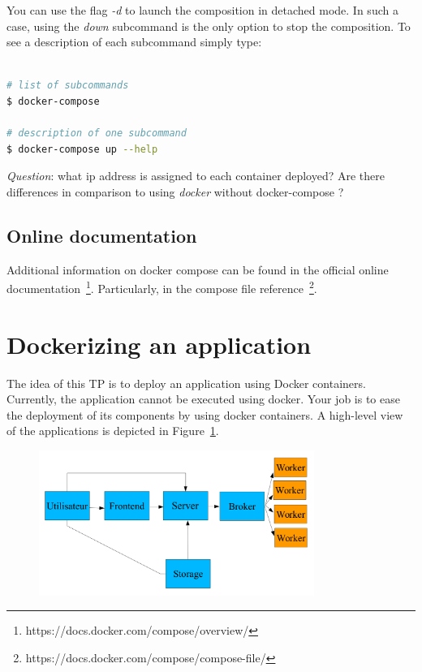\documentclass[a4paper,11pt]{exam}
\begin{document}
You can use the flag \textit{-d} to launch the composition in detached mode. In such a case, using the \textit{down} subcommand is the only option to stop the composition. 
To see a description of each subcommand simply type:
\begin{lstlisting}[frame=single,language={sh}] % Start your code-block

# list of subcommands
$ docker-compose

# description of one subcommand
$ docker-compose up --help
\end{lstlisting}

\textit{Question}: what ip address is assigned to each container deployed? Are there differences in comparison to using \textit{docker} without docker-compose ?

\subsection{Online documentation}
Additional information on docker compose can be found in the official online documentation~\footnote{https://docs.docker.com/compose/overview/}. Particularly,  in the compose file reference~\footnote{https://docs.docker.com/compose/compose-file/}.

\section{Dockerizing an application}

The idea of this TP is to deploy an application using Docker containers.
Currently, the application cannot be executed using docker. Your job is to ease the deployment of its components by using docker containers.
A high-level view of the applications is depicted in Figure~\ref{fig:architecture}.

\begin{figure}[!ht]
	\centering
	\includegraphics[width=0.8\textwidth]{fig/architecture.png}
	\label{fig:architecture}
\end{figure}
\end{document}
